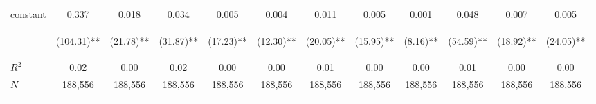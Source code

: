 \begin{tabular}{lccccccccccc}
\noalign{\smallskip}constant & 0.337 & 0.018 & 0.034 & 0.005 & 0.004 & 0.011 & 0.005 & 0.001 & 0.048 & 0.007 & 0.005\\
 & \begin{footnotesize}(104.31)**\end{footnotesize} & \begin{footnotesize}(21.78)**\end{footnotesize} & \begin{footnotesize}(31.87)**\end{footnotesize} & \begin{footnotesize}(17.23)**\end{footnotesize} & \begin{footnotesize}(12.30)**\end{footnotesize} & \begin{footnotesize}(20.05)**\end{footnotesize} & \begin{footnotesize}(15.95)**\end{footnotesize} & \begin{footnotesize}(8.16)**\end{footnotesize} & \begin{footnotesize}(54.59)**\end{footnotesize} & \begin{footnotesize}(18.92)**\end{footnotesize} & \begin{footnotesize}(24.05)**\end{footnotesize}\\
\noalign{\smallskip}$R^2$ & 0.02 & 0.00 & 0.02 & 0.00 & 0.00 & 0.01 & 0.00 & 0.00 & 0.01 & 0.00 & 0.00\\
$N$ & 188,556 & 188,556 & 188,556 & 188,556 & 188,556 & 188,556 & 188,556 & 188,556 & 188,556 & 188,556 & 188,556\\
\noalign{\smallskip}\hline\hline\end{tabular}
